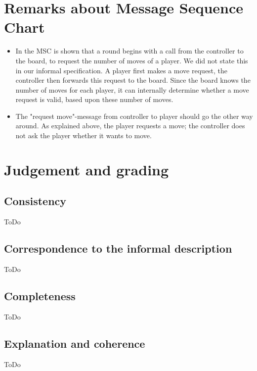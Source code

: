 \documentclass[a4paper,11pt]{article}
\begin{document}
    \section{Remarks about Message Sequence Chart}
    \begin{itemize}
        \item In the MSC is shown that a round begins with a call from the controller to the board, to request the number of moves of a player. We did not state this in our informal specification. A player first makes a move request, the controller then forwards this request to the board. Since the board knows the number of moves for each player, it can internally determine whether a move request is valid, based upon these number of moves.
        \item The "request move"-message from controller to player should go the other way around. As explained above, the player requests a move; the controller does not ask the player whether it wants to move.
    \end{itemize}

    \section{Judgement and grading}
    \subsection{Consistency}
    ToDo

    \subsection{Correspondence to the informal description}
    ToDo

    \subsection{Completeness}
    ToDo

    \subsection{Explanation and coherence}
    ToDo
\end{document}
